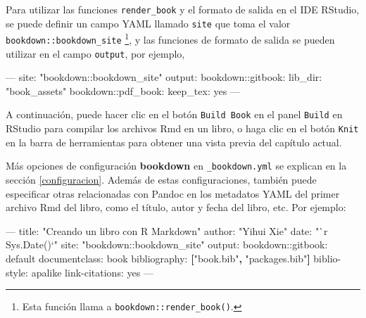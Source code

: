 \documentclass[12pt,]{krantz}
\makeatletter
\newenvironment{Shaded}{\begin{snugshade}}{\end{snugshade}}
\newcommand{\KeywordTok}[1]{\textcolor[rgb]{0.13,0.29,0.53}{\textbf{#1}}}
\newcommand{\StringTok}[1]{\textcolor[rgb]{0.31,0.60,0.02}{#1}}
\newcommand{\OtherTok}[1]{\textcolor[rgb]{0.56,0.35,0.01}{#1}}
\newcommand{\FunctionTok}[1]{\textcolor[rgb]{0.00,0.00,0.00}{#1}}
\newcommand{\AttributeTok}[1]{\textcolor[rgb]{0.77,0.63,0.00}{#1}}
\newenvironment{kframe}{%
\medskip{}
\setlength{\fboxsep}{.8em}
 \def\at@end@of@kframe{}%
 \ifinner\ifhmode%
  \def\at@end@of@kframe{\end{minipage}}%
  \begin{minipage}{\columnwidth}%
 \fi\fi%
 \def\FrameCommand##1{\hskip\@totalleftmargin \hskip-\fboxsep
 \colorbox{shadecolor}{##1}\hskip-\fboxsep
     \hskip-\linewidth \hskip-\@totalleftmargin \hskip\columnwidth}%
 \MakeFramed {\advance\hsize-\width
   \@totalleftmargin\z@ \linewidth\hsize
   \@setminipage}}%
 {\par\unskip\endMakeFramed%
 \at@end@of@kframe}
\renewenvironment{Shaded}{\begin{kframe}}{\end{kframe}}
\theoremstyle{definition}
\theoremstyle{definition}
\theoremstyle{definition}
\theoremstyle{remark}
\makeatother
\begin{document}
Para utilizar las funciones \texttt{render\_book} y el formato de salida
en el IDE RStudio, se puede definir un campo YAML llamado \texttt{site}
que toma el valor \texttt{bookdown::bookdown\_site} \footnote{Esta
  función llama a \texttt{bookdown::render\_book()}.}, y las funciones
de formato de salida se pueden utilizar en el campo \texttt{output}, por
ejemplo,

\begin{Shaded}
\begin{Highlighting}[]
\OtherTok{---}
\FunctionTok{site:}\AttributeTok{ }\StringTok{"bookdown::bookdown_site"}
\FunctionTok{output:}
  \FunctionTok{bookdown:}\AttributeTok{:gitbook:}
    \FunctionTok{lib_dir:}\AttributeTok{ }\StringTok{"book_assets"}
  \FunctionTok{bookdown:}\AttributeTok{:pdf_book:}
    \FunctionTok{keep_tex:}\AttributeTok{ yes}
\OtherTok{---}
\end{Highlighting}
\end{Shaded}

A continuación, puede hacer clic en el botón \texttt{Build\ Book} en el
panel \texttt{Build} en RStudio para compilar los archivos Rmd en un
libro, o haga clic en el botón \texttt{Knit} en la barra de herramientas
para obtener una vista previa del capítulo actual.

Más opciones de configuración \textbf{bookdown} en
\texttt{\_bookdown.yml} se explican en la sección \ref{configuracion}.
Además de estas configuraciones, también puede especificar otras
relacionadas con Pandoc en los metadatos YAML del primer archivo Rmd del
libro, como el título, autor y fecha del libro, etc. Por ejemplo:

\begin{Shaded}
\begin{Highlighting}[]
\OtherTok{--- }
\FunctionTok{title:}\AttributeTok{ }\StringTok{"Creando un libro con R Markdown"}
\FunctionTok{author:}\AttributeTok{ }\StringTok{"Yihui Xie"}
\FunctionTok{date:}\AttributeTok{ }\StringTok{"`r Sys.Date()`"}
\FunctionTok{site:}\AttributeTok{ }\StringTok{"bookdown::bookdown_site"}
\FunctionTok{output:}
  \FunctionTok{bookdown:}\AttributeTok{:gitbook: default}
\FunctionTok{documentclass:}\AttributeTok{ book}
\FunctionTok{bibliography:}\AttributeTok{ }\KeywordTok{[}\StringTok{"book.bib"}\KeywordTok{,} \StringTok{"packages.bib"}\KeywordTok{]}
\FunctionTok{biblio-style:}\AttributeTok{ apalike}
\FunctionTok{link-citations:}\AttributeTok{ yes}
\OtherTok{---}
\end{Highlighting}
\end{Shaded}
\end{document}
